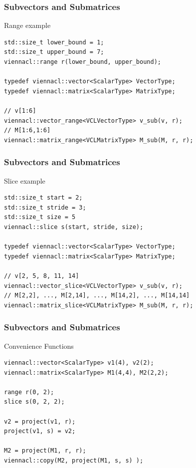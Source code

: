 \begin{frame}[fragile]
\frametitle{Subvectors and Submatrices}

  \begin{block}{Range example}
 \begin{lstlisting}
std::size_t lower_bound = 1;
std::size_t upper_bound = 7;
viennacl::range r(lower_bound, upper_bound);

typedef viennacl::vector<ScalarType> VectorType;
typedef viennacl::matrix<ScalarType> MatrixType;

// v[1:6]
viennacl::vector_range<VCLVectorType> v_sub(v, r);
// M[1:6,1:6]
viennacl::matrix_range<VCLMatrixType> M_sub(M, r, r);
 \end{lstlisting}
 \end{block}

 \vspace{0.45cm}
 
\end{frame}



\begin{frame}[fragile]
\frametitle{Subvectors and Submatrices}

\begin{block}{Slice example}
 \begin{lstlisting}
std::size_t start = 2;
std::size_t stride = 3;
std::size_t size = 5
viennacl::slice s(start, stride, size);

typedef viennacl::vector<ScalarType> VectorType;
typedef viennacl::matrix<ScalarType> MatrixType;

// v[2, 5, 8, 11, 14]
viennacl::vector_slice<VCLVectorType> v_sub(v, r);
// M[2,2], ..., M[2,14], ..., M[14,2], ..., M[14,14]
viennacl::matrix_slice<VCLMatrixType> M_sub(M, r, r);
 \end{lstlisting}
 \end{block}

\end{frame}



\begin{frame}[fragile]
\frametitle{Subvectors and Submatrices}
 \begin{block}{Convenience Functions}
 \begin{lstlisting}
viennacl::vector<ScalarType> v1(4), v2(2);
viennacl::matrix<ScalarType> M1(4,4), M2(2,2);
 
range r(0, 2);
slice s(0, 2, 2);

v2 = project(v1, r);
project(v1, s) = v2;

M2 = project(M1, r, r);
viennacl::copy(M2, project(M1, s, s) );
 \end{lstlisting}
 \end{block}

\end{frame}



